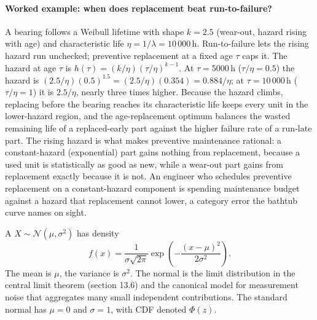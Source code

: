 \paragraph{Worked example: when does replacement beat run-to-failure?}
A bearing follows a Weibull lifetime with shape $k = 2.5$ (wear-out,
hazard rising with age) and characteristic life $\eta = 1/\lambda =
10\,000\,\text{h}$. Run-to-failure lets the rising hazard run unchecked;
preventive replacement at a fixed age $\tau$ caps it. The hazard at age
$\tau$ is $h(\tau) = (k/\eta)(\tau/\eta)^{k - 1}$. At $\tau =
5000\,\text{h}$ ($\tau/\eta = 0.5$) the hazard is $(2.5/\eta)(0.5)^{1.5}
= (2.5/\eta)(0.354) = 0.884/\eta$; at $\tau = 10\,000\,\text{h}$
($\tau/\eta = 1$) it is $2.5/\eta$, nearly three times higher. Because
the hazard climbs, replacing before the bearing reaches its
characteristic life keeps every unit in the lower-hazard region, and the
age-replacement optimum balances the wasted remaining life of a
replaced-early part against the higher failure rate of a run-late part.
The rising hazard is what makes preventive maintenance rational: a
constant-hazard (exponential) part gains nothing from replacement,
because a used unit is statistically as good as new, while a wear-out
part gains from replacement exactly because it is not. An engineer who
schedules preventive replacement on a constant-hazard component is
spending maintenance budget against a hazard that replacement cannot
lower, a category error the bathtub curve names on sight.

A  $X \sim \mathcal{N}(\mu,
\sigma^{2})$ has density
\[
f(x) = \frac{1}{\sigma\sqrt{2\pi}}
\exp\!\left(-\frac{(x - \mu)^{2}}{2\sigma^{2}}\right).
\]
The mean is $\mu$, the variance is $\sigma^{2}$. The normal is the
limit distribution in the central limit theorem (section 13.6) and
the canonical model for measurement noise that aggregates many
small independent contributions. The standard normal has $\mu = 0$
and $\sigma = 1$, with CDF denoted $\Phi(z)$.

